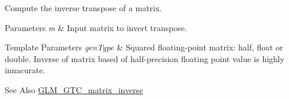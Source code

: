Compute the inverse transpose of a matrix. 


\begin{DoxyParams}{Parameters}
{\em m} & Input matrix to invert transpose. \\
\hline
\end{DoxyParams}

\begin{DoxyTemplParams}{Template Parameters}
{\em gen\-Type} & Squared floating-\/point matrix\-: half, float or double. Inverse of matrix based of half-\/precision floating point value is highly innacurate. \\
\hline
\end{DoxyTemplParams}
\begin{DoxySeeAlso}{See Also}
\hyperlink{group__gtc__matrix__inverse}{G\-L\-M\-\_\-\-G\-T\-C\-\_\-matrix\-\_\-inverse} 
\end{DoxySeeAlso}
